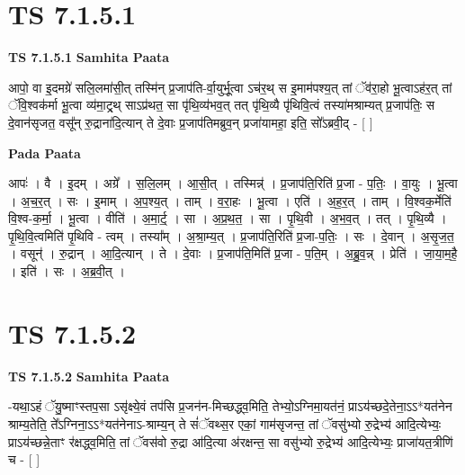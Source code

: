\documentclass[17pt]{extarticle}
\begin{document}

\section{ TS 7.1.5.1 }

\textbf{TS 7.1.5.1 } \newline
\textbf{Samhita Paata} \newline

आपो॒ वा इ॒दमग्रे॑ सलि॒लमा॑सी॒त् तस्मि॑न् प्र॒जाप॑ति-र्वा॒युर्भू॒त्वा ऽच॑र॒थ् स इ॒माम॑पश्य॒त् तां ॅव॑रा॒हो भू॒त्वाऽह॑र॒त् तां ॅवि॒श्वक॑र्मा भू॒त्वा व्य॑मा॒ट्र्थ् साऽप्र॑थत॒ सा पृ॑थि॒व्य॑भव॒त् तत् पृ॑थि॒व्यै पृ॑थिवि॒त्वं तस्या॑मश्राम्यत् प्र॒जाप॑तिः॒ स दे॒वान॑सृजत॒ वसू᳚न् रु॒द्राना॑दि॒त्यान् ते दे॒वाः प्र॒जाप॑तिमब्रुव॒न् प्रजा॑यामहा॒ इति॒ सो᳚ऽब्रवी॒द् - [  ] \newline

\textbf{Pada Paata} \newline

आपः॑ । वै । इ॒दम् । अग्रे᳚ । स॒लि॒लम् । आ॒सी॒त् । तस्मिन्न्॑ । प्र॒जाप॑ति॒रिति॑ प्र॒जा - प॒तिः॒ । वा॒युः । भू॒त्वा । अ॒च॒र॒त् । सः । इ॒माम् । अ॒प॒श्य॒त् । ताम् । व॒रा॒हः । भू॒त्वा । एति॑ । अ॒ह॒र॒त् । ताम् । वि॒श्वक॒र्मेति॑ वि॒श्व-क॒र्मा॒ । भू॒त्वा । वीति॑ । अ॒मा॒र्ट्॒ । सा । अ॒प्र॒थ॒त॒ । सा । पृ॒थि॒वी । अ॒भ॒व॒त् । तत् । पृ॒थि॒व्यै । पृ॒थि॒वि॒त्वमिति॑ पृ॒थिवि - त्वम् । तस्या᳚म् । अ॒श्रा॒म्य॒त् । प्र॒जाप॑ति॒रिति॑ प्र॒जा-प॒तिः॒ । सः । दे॒वान् । अ॒सृ॒ज॒त॒ । वसून्॑ । रु॒द्रान् । आ॒दि॒त्यान् । ते । दे॒वाः । प्र॒जाप॑ति॒मिति॑ प्र॒जा - प॒ति॒म् । अ॒ब्रु॒व॒न्न् । प्रेति॑ । जा॒या॒म॒है॒ । इति॑ । सः । अ॒ब्र॒वी॒त् ।  \newline





\section{ TS 7.1.5.2 }

\textbf{TS 7.1.5.2 } \newline
\textbf{Samhita Paata} \newline

-यथा॒ऽहं ॅयु॒ष्माꣳस्तप॒सा ऽसृ॑क्ष्ये॒वं तप॑सि प्र॒जन॑न-मिच्छद्ध्व॒मिति॒ तेभ्यो॒ऽग्निमा॒यत॑नं॒ प्राऽय॑च्छदे॒तेना॒ऽऽ*यत॑नेन श्राम्य॒तेति॒ ते᳚ऽग्निना॒ऽऽ*यत॑नेनाऽ-श्राम्य॒न् ते सं॑ॅवथ्स॒र एकां॒ गाम॑सृजन्त॒ तां ॅवसु॑भ्यो रु॒द्रेभ्य॑ आदि॒त्येभ्यः॒ प्राऽय॑च्छन्ने॒ताꣳ र॑क्षद्ध्व॒मिति॒ तां ॅवस॑वो रु॒द्रा आ॑दि॒त्या अ॑रक्षन्त॒ सा वसु॑भ्यो रु॒द्रेभ्य॑ आदि॒त्येभ्यः॒ प्राजा॑यत॒त्रीणि॑ च - [  ] \newline
\end{document}
